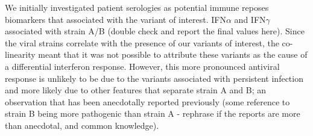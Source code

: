 \documentclass{article}
\begin{document}
We initially investigated patient serologies as potential immune reposes biomarkers that associated with the variant of interest.
IFN$\alpha$ and IFN$\gamma$ associated with strain A/B
(double check and report the final values here). 
Since the viral strains correlate with the presence of our variants of interest, the co-linearity meant that it was not possible to attribute these variants as the cause of a differential interferon response.
However, this more pronounced antiviral response is unlikely to be due to the variants associated with persistent infection and more likely due to other features that separate strain A and B; an observation that has been anecdotally reported previously 
(some reference to strain B being more pathogenic than strain A - rephrase if the reports are more than anecdotal, and common knowledge). 





\end{document}
